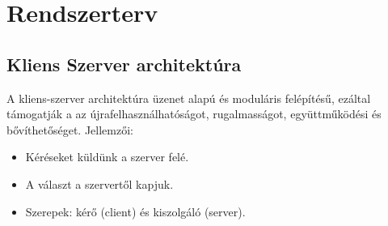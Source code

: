 \makeatletter
\def\thickhrulefill{\leavevmode \leaders \hrule height 1ex \hfill \kern \z@}
\def\@makechapterhead#1{%
  \vspace*{10\p@}%
  {\parindent \z@ \centering \reset@font
        {\Huge \scshape \thechapter}
        \par\nobreak
        \vspace*{15\p@}%
        \interlinepenalty\@M
        \begin{tabular}{@{\qquad}c@{\qquad}}
          \hline
          \\
          {\Huge \bfseries #1\par\nobreak} \\
          \\
          \hline
        \end{tabular}
    \vskip 100\p@
  }}
\def\@makeschapterhead#1{%
  \vspace*{10\p@}%
  {\parindent \z@ \centering \reset@font
        {\Huge \scshape \vphantom{\thechapter}}
        \par\nobreak
        \vspace*{15\p@}%
        \interlinepenalty\@M
        \begin{tabular}{@{\qquad}c@{\qquad}}
          \hline
          \\
          {\Huge \bfseries #1\par\nobreak} \\
          \\
          \hline
        \end{tabular}
    \vskip 100\p@
  }}

\chapter{Rendszerterv}

\section{Kliens Szerver architektúra} %
\label{sec:kliens_szerver_architektúra}
\indent A kliens-szerver architektúra üzenet alapú és moduláris felépítésű, ezáltal támogatják a az újrafelhasználhatóságot, rugalmasságot, együttműködési és bővíthetőséget. Jellemzői:
\begin{itemize}
  \item Kéréseket küldünk a szerver felé.
  \item A választ a szervertől kapjuk.
  \item Szerepek: kérő (client) és kiszolgáló (server).
\end{itemize}

